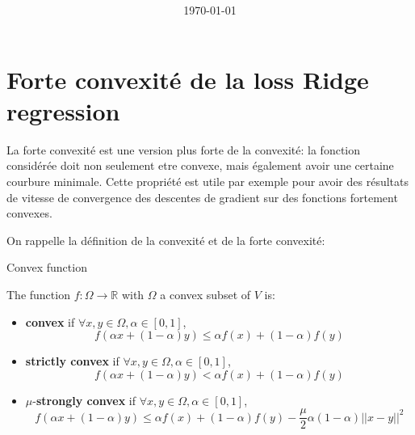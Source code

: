 \documentclass[
10pt, %
a4paper, %
oneside, %
headinclude,footinclude, %
BCOR5mm, %
]{scrartcl}
\title{\normalfont{FTML Exercices 4}\\
}
\author{\spacedlowsmallcaps{}
}
\date{\today}
\begin{document}
\renewcommand{\sectionmark}[1]{\markright{\spacedlowsmallcaps{#1}}}
\lehead{\mbox{\llap{\small\thepage\kern1em\color{halfgray} \vline}\color{halfgray}\hspace{0.5em}\rightmark\hfil}} 
\pagestyle{scrheadings}
\maketitle 
\setcounter{tocdepth}{3} 

\tableofcontents

\section{\large\color{Blue}Forte convexité de la loss Ridge regression}

La forte convexité est une version plus forte de la convexité: la fonction considérée doit non seulement etre convexe, mais également avoir une certaine courbure minimale. Cette propriété est utile par exemple pour avoir des résultats de vitesse de convergence des descentes de gradient sur des fonctions fortement convexes.

On rappelle la définition de la convexité et de la forte convexité:

\begin{definition}{Convex function}
    \label{def:convexity}

    The function $f:\Omega \rightarrow \mathbb{R} $ with $\Omega$ a convex subset of $V$ is:
    \begin{itemize}
	\item \textbf{{convex}} if $\forall x, y\in \Omega, \alpha\in [0,1]$,
	    \begin{equation*}
		f(\alpha x+(1-\alpha)y)\leq \alpha f(x)+(1-\alpha)f(y)
	    \end{equation*}
	\item \textbf{{strictly convex}} if $\forall x, y\in \Omega, \alpha\in [0,1]$,
	    \begin{equation*}
		f(\alpha x+(1-\alpha)y)< \alpha f(x)+(1-\alpha)f(y)
	    \end{equation*}
	\item $\mu$-\textbf{{strongly convex}} if $\forall x, y\in \Omega, \alpha\in [0,1]$,
	    \begin{equation*}
		f(\alpha x+(1-\alpha)y)\leq \alpha f(x)+(1-\alpha)f(y)- \frac{\mu}{2} \alpha(1-\alpha)||x-y||^2
	    \end{equation*}
    \end{itemize}
\end{definition}
\end{document}

